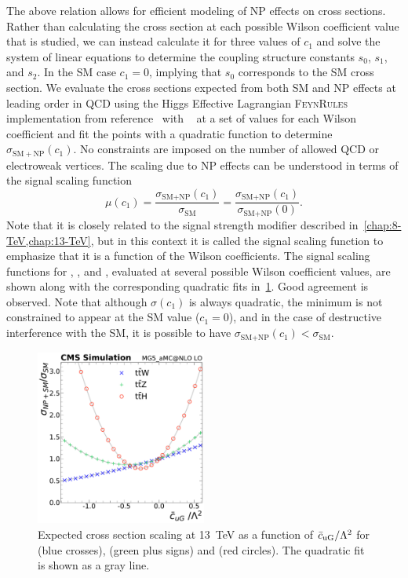 The above relation allows for efficient modeling of NP effects on cross
sections. Rather than calculating the cross section at each possible Wilson
coefficient value that is studied, we can instead calculate it for three values
of $c_1$ and solve the system of linear equations to determine the coupling
structure constants $s_0$, $s_1$, and $s_2$. In the SM case $c_1=0$, implying
that $s_0$ corresponds to the SM cross section. We evaluate the cross sections
expected from both SM and NP effects at leading order in QCD using the Higgs
Effective Lagrangian \textsc{FeynRules}~\cite{Alloul2013} implementation from
reference~\cite{Alloul2014} with \madgraph~\cite{Alwall2011} at a set of values
for each Wilson coefficient and fit the points with a quadratic function to
determine $\sigma_{\mathrm{SM+NP}}(c_1)$. No constraints are imposed on the
number of allowed QCD or electroweak vertices. The scaling due to NP effects can
be understood in terms of the signal scaling function
\begin{equation}
  \label{eq:scaling}
  \mu(c_1)= \frac{\sigma_\text{SM+NP}(c_1)}{\sigma_\text{SM}} = \frac{\sigma_\text{SM+NP}(c_1)}{\sigma_\text{SM+NP}(0)}.
\end{equation}
Note that it is closely related to the signal strength modifier described
in~\cref{chap:8-TeV,chap:13-TeV}, but in this context it is called the signal
scaling function to emphasize that it is a function of the Wilson coefficients.
The signal scaling functions for \ttW, \ttZ, and \ttH, evaluated at several
possible Wilson coefficient values, are shown along with the corresponding
quadratic fits in~\cref{fig:scaling}. Good agreement is observed. Note that
although $\sigma(c_1)$ is always quadratic, the minimum is not constrained to
appear at the SM value ($c_1=0$), and in the case of destructive interference
with the SM, it is possible to have $\sigma_{\text{SM+NP}}(c_1) <
\sigma_{\text{SM}}$.

\begin{figure}
  \centering
  \includegraphics[width=0.5\textwidth]{figures/scaling/cuG}
  \caption[Expected cross section scaling at \SI{13}{TeV} due to \cuG]{
    Expected cross section scaling at \SI{13}{TeV} as a function of $\bar{c}_{\text{uG}} /
    \Lambda^2$ for \ttW (blue crosses), \ttZ (green plus signs) and \ttH (red
    circles). The quadratic fit is shown as a gray line.
    \label{fig:scaling}
  }
\end{figure}

